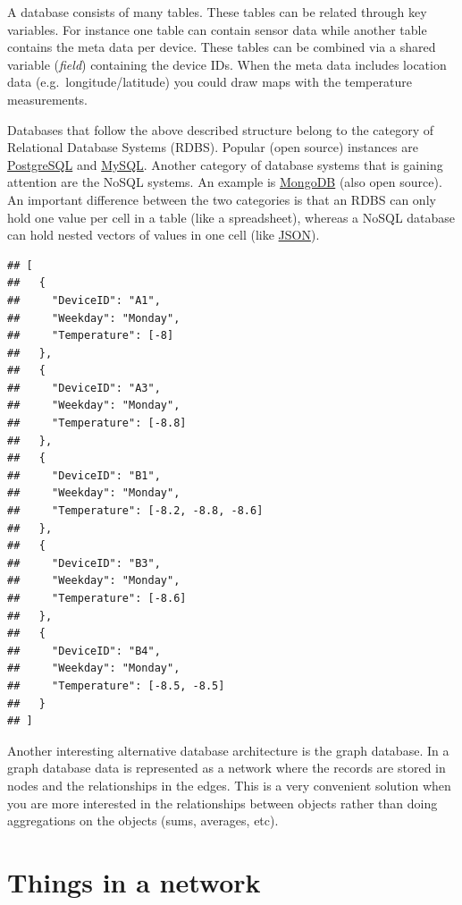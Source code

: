 \documentclass[]{book}
\theoremstyle{definition}
\theoremstyle{definition}
\theoremstyle{remark}
\begin{document}
A database consists of many tables. These tables can be related through
key variables. For instance one table can contain sensor data while
another table contains the meta data per device. These tables can be
combined via a shared variable (\emph{field}) containing the device IDs.
When the meta data includes location data (e.g.~longitude/latitude) you
could draw maps with the temperature measurements.

Databases that follow the above described structure belong to the
category of Relational Database Systems (RDBS). Popular (open source)
instances are \href{https://www.postgresql.org/}{PostgreSQL} and
\href{https://www.mysql.com/}{MySQL}. Another category of database
systems that is gaining attention are the NoSQL systems. An example is
\href{https://www.mongodb.com/}{MongoDB} (also open source). An
important difference between the two categories is that an RDBS can only
hold one value per cell in a table (like a spreadsheet), whereas a NoSQL
database can hold nested vectors of values in one cell (like
\href{http://www.json.org/}{JSON}).

\begin{verbatim}
## [
##   {
##     "DeviceID": "A1",
##     "Weekday": "Monday",
##     "Temperature": [-8]
##   },
##   {
##     "DeviceID": "A3",
##     "Weekday": "Monday",
##     "Temperature": [-8.8]
##   },
##   {
##     "DeviceID": "B1",
##     "Weekday": "Monday",
##     "Temperature": [-8.2, -8.8, -8.6]
##   },
##   {
##     "DeviceID": "B3",
##     "Weekday": "Monday",
##     "Temperature": [-8.6]
##   },
##   {
##     "DeviceID": "B4",
##     "Weekday": "Monday",
##     "Temperature": [-8.5, -8.5]
##   }
## ]
\end{verbatim}

\citep[Video:][]{google_developers_google_nodate}

Another interesting alternative database architecture is the graph
database. In a graph database data is represented as a network where the
records are stored in nodes and the relationships in the edges. This is
a very convenient solution when you are more interested in the
relationships between objects rather than doing aggregations on the
objects (sums, averages, etc).

\citep[Video:][]{neo4j_-_the_worlds_leading_graph_database_intro_nodate}

\section{Things in a network}\label{things-in-a-network}
\end{document}
